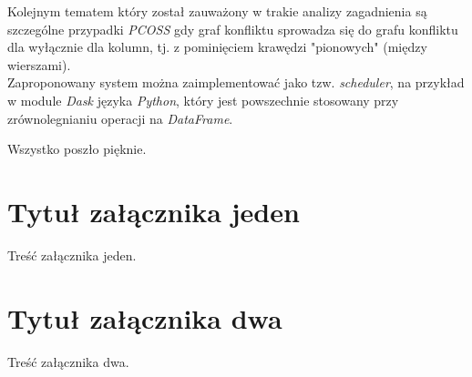 \documentclass[brudnopis]{xmgr}
\begin{document}
Kolejnym tematem który został zauważony w trakie analizy zagadnienia są szczególne przypadki \emph{PCOSS} gdy graf konfliktu sprowadza się do grafu konfliktu dla wyłącznie dla kolumn, tj. z pominięciem krawędzi "pionowych" (między wierszami).
\medskip\\

Zaproponowany system można zaimplementować jako tzw. \emph{scheduler}, na przykład w module \emph{Dask} języka \emph{Python}, który jest powszechnie stosowany przy zrównolegnianiu operacji na \emph{DataFrame}.

\summary

Wszystko poszło pięknie.

\appendix
\chapter{Tytuł załącznika jeden}

Treść załącznika jeden.

\chapter{Tytuł załącznika dwa}

Treść załącznika dwa.




\listoftables

\listoffigures

\oswiadczenie
\end{document}
